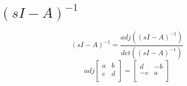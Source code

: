 \section{$(sI-A)^{-1}$}
\[
	(sI-A)^{-1} = \frac{adj((sI-A)^{-1})}{det((sI-A)^{-1})}
\]
\[
	adj
	\begin{bmatrix}
		a & b \\
		c & d\\
	\end{bmatrix}
	=
	\begin{bmatrix}
			d & -b \\
			-c & a\\
	\end{bmatrix}
\]